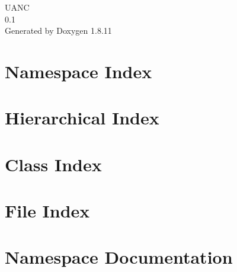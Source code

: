 \documentclass[twoside]{book}
\newcommand{\+}{\discretionary{\mbox{\scriptsize$\hookleftarrow$}}{}{}}
\newcommand{\clearemptydoublepage}{%
  \newpage{\pagestyle{empty}\cleardoublepage}%
}
\begin{document}
\hypersetup{pageanchor=false,
             bookmarksnumbered=true,
             pdfencoding=unicode
            }
\begin{titlepage}
\vspace*{7cm}
\begin{center}%
{\Large U\+A\+NC \\[1ex]\large 0.\+1 }\\
\vspace*{1cm}
{\large Generated by Doxygen 1.8.11}\\
\end{center}
\end{titlepage}
\clearemptydoublepage
\tableofcontents
\clearemptydoublepage
{}
\hypersetup{pageanchor=true}

\chapter{Namespace Index}

\chapter{Hierarchical Index}

\chapter{Class Index}

\chapter{File Index}

\chapter{Namespace Documentation}














\end{document}
